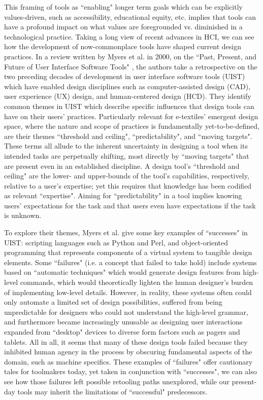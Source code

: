 This framing of tools as ``enabling" longer term goals which can be explicitly values-driven, such as accessibility, educational equity, etc. implies that tools can have a profound impact on what values are foregrounded vs. diminished in a technological practice. Taking a long view of recent advances in HCI, we can see how the development of now-commonplace tools have shaped current design practices. In a review written by Myers et al. in 2000, on the ``Past, Present, and Future of User Interface Software Tools" \cite{myers_past_2000}, the authors take a retrospective on the two preceding decades of development in user interface software tools (UIST) which have enabled design disciplines such as computer-assisted design (CAD), user experience (UX) design, and human-centered design (HCD). They identify common themes in UIST which describe specific influences that design tools can have on their users' practices. Particularly relevant for e-textiles' emergent design space, where the nature and scope of practices is fundamentally yet-to-be-defined, are their themes ``threshold and ceiling", ``predictability", and ``moving targets". These terms all allude to the inherent uncertainty in designing a tool when its intended tasks are perpetually shifting, most directly by ``moving targets" that are present even in an established discipline. A design tool's ``threshold and ceiling" are the lower- and upper-bounds of the tool's capabilities, respectively, relative to a user's expertise; yet this requires that knowledge has been codified as relevant ``expertise". Aiming for ``predictability" in a tool implies knowing users' expectations for the task and that users even have expectations if the task is unknown. 

To explore their themes, Myers et al. give some key examples of ``successes" in UIST: scripting languages such as Python and Perl, and object-oriented programming that represents components of a virtual system to tangible design elements. Some ``failures" (i.e. a concept that failed to take hold) include systems based on ``automatic techniques" which would generate design features from high-level commands, which would theoretically lighten the human designer's burden of implementing low-level details. However, in reality, these systems often could only automate a limited set of design possibilities, suffered from being unpredictable for designers who could not understand the high-level grammar, and furthermore became increasingly unusable as designing user interactions expanded from ``desktop" devices to diverse form factors such as pagers and tablets. All in all, it seems that many of these design tools failed because they inhibited human agency in the process by obscuring fundamental aspects of the domain, such as machine specifics. These examples of ``failures" offer cautionary tales for toolmakers today, yet taken in conjunction with ``successes", we can also see how those failures left possible retooling paths unexplored, while our present-day tools may inherit the limitations of ``successful" predecessors.


